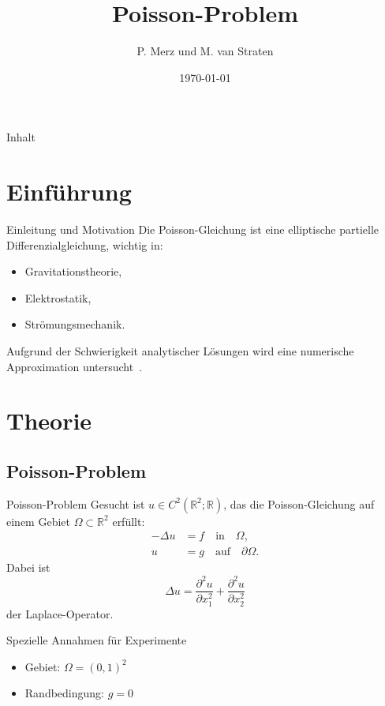 \documentclass[9pt, t]{beamer}
\title{Poisson-Problem}
\author{P. Merz und M. van Straten}
\institute{Humboldt-Universität zu Berlin \\
           Wintersemester 2024}
\date{\today}
\newcommand\R{\mathbb{R}}
\begin{document}
\maketitle

\begin{frame}{Inhalt}
    \tableofcontents[pausesections]
\end{frame}

\section{Einführung}

\begin{frame}{Einleitung und Motivation}
    Die Poisson-Gleichung ist eine elliptische partielle Differenzialgleichung, wichtig in:
    \begin{itemize}[<+->]
        \item Gravitationstheorie,
        \item Elektrostatik,
        \item Strömungsmechanik.
    \end{itemize}
    \pause%
    Aufgrund der Schwierigkeit analytischer Lösungen wird eine numerische
    Approximation untersucht\ \cite{Poisson}.
\end{frame}

\section{Theorie}

\subsection{Poisson-Problem}

\begin{frame}{Poisson-Problem}
    Gesucht ist \(u \in C^2(\R^2; \R)\), das die
    Poisson-Gleichung auf einem Gebiet \(\Omega \subset \R^2\) erfüllt:
    \pause%
    \begin{align*}
        -\Delta u & = f \quad \text{in} \quad \Omega,           \\
        u         & = g \quad \text{auf} \quad \partial \Omega.
    \end{align*}
    \pause%
    Dabei ist
    \[
        \Delta u = \frac{\partial^2 u}{\partial x_1^2} + \frac{\partial^2 u}{\partial x_2^2}
    \]
    der Laplace-Operator.\ \pause%
    \begin{block}{Spezielle Annahmen für Experimente}
        \begin{itemize}[<+->]
            \item Gebiet: \(\Omega = {(0, 1)}^2\)
            \item Randbedingung: \(g = 0\)
        \end{itemize}
    \end{block}
\end{frame}
\end{document}
